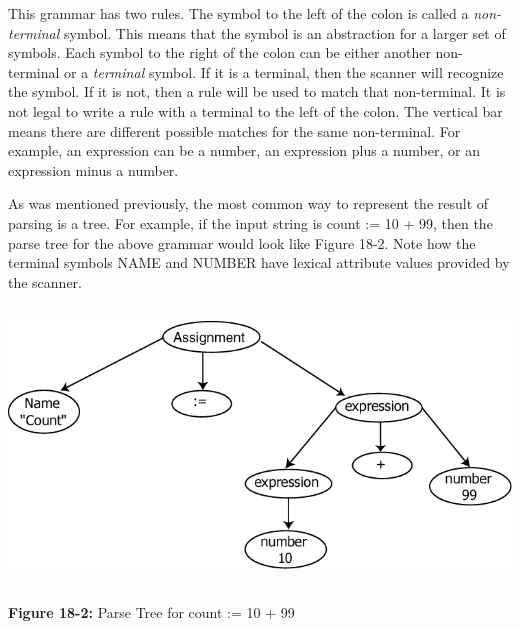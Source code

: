 
This grammar has two rules. The symbol to the left of the colon is
called a \textit{non-terminal} symbol. This means that the symbol is an
abstraction for a larger set of symbols. Each symbol to the right of
the colon can be either another non-terminal or a \textit{terminal}
symbol. If it is a terminal, then the scanner will recognize the
symbol. If it is not, then a rule will be used to match that
non-terminal. It is not legal to write a rule with a terminal to the
left of the colon. The vertical bar means there are different possible
matches for the same non-terminal. For example, an expression can be a
number, an expression plus a number, or an expression minus a number.

As was mentioned previously, the most common way to represent the result
of parsing is a tree. For example, if the input string is
\textsf{{\textquotedbl}count := 10 + 99{\textquotedbl}}, then the parse
tree for the above grammar would look like Figure 18-2. Note how the
terminal symbols NAME and NUMBER have lexical attribute values provided
by the scanner.


\bigskip

\begin{center}
\includegraphics[width=5.8752in,height=2.8929in]{ub-img/ub-img65.png}
\end{center}

{\sffamily\bfseries Figure 18-2:}
{\sffamily Parse Tree for {\textquotedbl}count := 10 + 99{\textquotedbl}}

